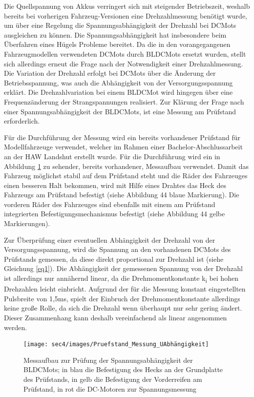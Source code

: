 Die Quellspannung von Akkus verringert sich mit steigender Betriebszeit, weshalb bereits bei vorherigen Fahrzeug-Versionen eine Drehzahlmessung benötigt wurde, um über eine Regelung die Spannungsabhängigkeit der Drehzahl bei \acp{DCMot} ausgleichen zu können. Die Spannungsabhängigkeit hat insbesondere beim Überfahren eines Hügels Probleme bereitet. Da die in den vorangegangenen Fahrzeugmodellen verwendeten \acp{DCMot} durch \acp{BLDCMot} ersetzt wurden, stellt sich allerdings erneut die Frage nach der Notwendigkeit einer Drehzahlmessung. Die Variation der Drehzahl erfolgt bei \acp{DCMot} über die Änderung der Betriebsspannung, was auch die Abhängigkeit von der Versorgungsspannung erklärt. Die Drehzahlvariation bei einem \ac{BLDCMot} wird hingegen über eine Frequenzänderung der Strangspannungen realisiert. Zur Klärung der Frage nach einer Spannungsabhängigkeit der \acp{BLDCMot}, ist eine Messung am Prüfstand erforderlich.\vspace{11pt}

	Für die Durchführung der Messung wird ein bereits vorhandener Prüfstand für Modellfahrzeuge verwendet, welcher im Rahmen einer Bachelor-Abschlussarbeit an der HAW Landshut erstellt wurde. Für die Durchführung wird ein in Abbildung \ref{fig:Pruefstand01} zu sehender, bereits vorhandener, Messaufbau verwendet. Damit das Fahrzeug möglichst stabil auf dem Prüfstand steht und die Räder des Fahrzeuges einen besseren Halt bekommen, wird mit Hilfe eines Drahtes das Heck des Fahrzeugs am Prüfstand befestigt (siehe Abbildung 44 blaue Markierung). Die vorderen Räder des Fahrzeuges sind ebenfalls mit einem am Prüfstand integrierten Befestigungsmechanismus befestigt (siehe Abbildung 44 gelbe Markierungen). \vspace{11pt}

Zur Überprüfung einer eventuellen Abhängigkeit der Drehzahl von der Versorgungsspannung, wird die Spannung an den vorhandenen \acp{DCMot} des Prüfstands gemessen, da diese direkt proportional zur Drehzahl ist (siehe Gleichung \ref{eq1}). Die Abhängigkeit der gemessenen Spannung von der Drehzahl ist allerdings nur annähernd linear, da die Drehmomentkonstante k\textsubscript{i} bei hohen Drehzahlen leicht einbricht. Aufgrund der für die Messung konstant eingestellten Pulsbreite von 1,5ms, spielt der Einbruch der Drehmomentkonstante allerdings keine große Rolle, da sich die Drehzahl wenn überhaupt nur sehr gering ändert. Dieser Zusammenhang kann deshalb vereinfachend als linear angenommen werden.


\begin{figure}[H] %
\texttt{[image: sec4/images/Pruefstand\_Messung\_UAbhängigkeit]} 
\centering
\captionsetup{width=.95\textwidth}
\caption[Messaufbau zur Prüfung der Spannungsabhängigkeit der \acp{BLDCMot}]{Messaufbau zur Prüfung der Spannungsabhängigkeit der \acp{BLDCMot}; in blau die Befestigung des Hecks an der Grundplatte des Prüfstands, in gelb die Befestigung der Vorderreifen am Prüfstand, in rot die DC-Motoren zur Spannungsmessung}\centering
\label{fig:Pruefstand01}
\end{figure}

